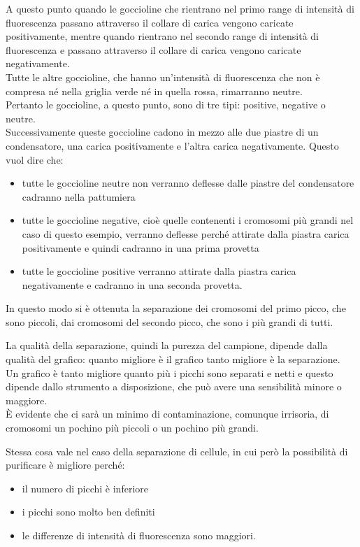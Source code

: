 \documentclass[11pt]{book}
\begin{document}
A questo punto quando le goccioline che rientrano nel primo range di intensità di fluorescenza passano attraverso il collare di carica vengono caricate positivamente, mentre quando rientrano nel secondo range di intensità di fluorescenza e passano attraverso il collare di carica vengono caricate negativamente.\\
Tutte le altre goccioline, che hanno un’intensità di fluorescenza che non è compresa né nella griglia verde né in quella rossa, rimarranno neutre.\\
Pertanto le goccioline, a questo punto, sono di tre tipi: positive, negative o neutre.\\
Successivamente queste goccioline cadono in mezzo alle due piastre di un condensatore, una carica positivamente e l’altra carica negativamente. Questo vuol dire che:
\begin{itemize}
\item tutte le goccioline neutre non verranno deflesse dalle piastre del condensatore cadranno nella pattumiera
\item tutte le goccioline negative, cioè quelle contenenti i cromosomi più grandi nel caso di questo esempio, verranno deflesse perché attirate dalla piastra carica positivamente e quindi cadranno in una prima provetta
\item tutte le goccioline positive verranno attirate dalla piastra carica negativamente e cadranno in una seconda provetta.
\end{itemize}

In questo modo si è ottenuta la separazione dei cromosomi del primo picco, che sono piccoli, dai cromosomi del secondo picco, che sono i più grandi di tutti.

La qualità della separazione, quindi la purezza del campione, dipende dalla qualità del grafico: quanto migliore è il grafico tanto migliore è la separazione.\\
Un grafico è tanto migliore quanto più i picchi sono separati e netti e questo dipende dallo strumento a disposizione, che può avere una sensibilità minore o maggiore.\\
È evidente che ci sarà un minimo di contaminazione, comunque irrisoria, di cromosomi un pochino più piccoli o un pochino più grandi.

Stessa cosa vale nel caso della separazione di cellule, in cui però la possibilità di purificare è migliore perché:
\begin{itemize}
\item il numero di picchi è inferiore
\item i picchi sono molto ben definiti
\item le differenze di intensità di fluorescenza sono maggiori.
\end{itemize}
\end{document}
